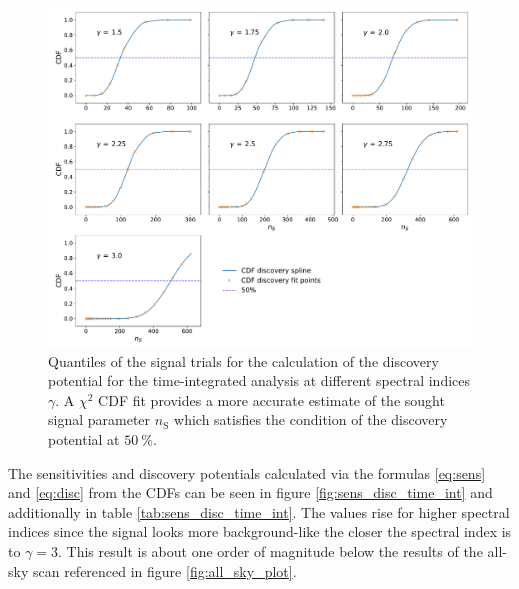 \begin{figure}[H]
    \centering
    \includegraphics[width=\linewidth]{Plots/05_csky/9_years_gfu_gold_cdf_disc.pdf}
    \caption{Quantiles of the signal trials for the calculation of the discovery potential for the time-integrated analysis at different spectral indices $\gamma$. A $\chi^2$ CDF fit provides a more accurate estimate of the sought signal parameter $n_\text{S}$ which satisfies the condition of the discovery potential at $\SI{50}{\percent}$.}
    \label{fig:cdf_disc}
\end{figure}
The sensitivities and discovery potentials calculated via the formulas \eqref{eq:sens} and \eqref{eq:disc} from the CDFs can be seen in figure \ref{fig:sens_disc_time_int} and additionally in table \ref{tab:sens_disc_time_int}.
The values rise for higher spectral indices since the signal looks more background-like the closer the spectral index is to $\gamma = 3$.
This result is about one order of magnitude below the results of the all-sky scan \cite{all_sky_paper} referenced in figure \ref{fig:all_sky_plot}.
